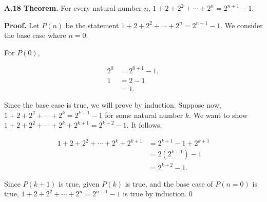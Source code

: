 \documentclass[12pt]{article}
\begin{document}
\noindent\textbf{A.18 Theorem.} For every natural number $n$, $1+2+2^2+\cdots +2^n= 2^{n+1}-1$.

\bigskip

\noindent\textbf{Proof.} Let $P(n)$ be the statement $1+2+2^2+\cdots +2^n= 2^{n+1}-1$. We consider the base case where $n=0$. 

\bigskip

\noindent For $P(0)$,


\begin{align*}
2^0 &= 2^{0+1}-1, \\
1 &= 2-1 \\
&= 1.
\end{align*}


\noindent Since the base case is true, we will prove by induction. Suppose now, $1+2+2^2+\cdots +2^k= 2^{k+1}-1$ for some natural number $k$. We want to show $1+2+2^2+\cdots +2^k +2^{k+1}= 2^{k+2}-1$. It follows,


\begin{align*}
1+2+2^2+\cdots +2^k+2^{k+1} &= 2^{k+1}-1 +2^{k+1} \\
&= 2(2^{k+1})-1 \\
&= 2^{k+2}-1.
\end{align*}


\noindent Since $P(k+1)$ is true, given $P(k)$ is true, and the base case of $P(n=0)$ is true, $1+2+2^2+\cdots +2^n= 2^{n+1}-1$ is true by induction.\qed
\end{document}
